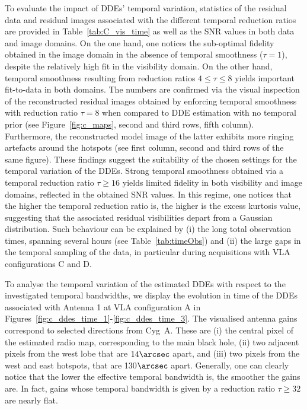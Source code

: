 \documentclass[fleqn,usenatbib]{mnras}
\begin{document}
To evaluate the impact of DDEs' temporal variation, statistics of the residual data and residual images associated with the different temporal reduction ratios are provided in Table~\ref{tab:C_vis_time} as well as the SNR values in both data and image domains. 
On the one hand, one notices the sub-optimal fidelity obtained in the image domain in the absence of temporal smoothness ($\tau=1$), despite the relatively high fit in the visibility domain. On the other hand, temporal smoothness resulting from reduction ratios $4\leq \tau \leq 8$ yields important fit-to-data in both domains. The numbers are confirmed via the visual inspection of the reconstructed residual images obtained by enforcing temporal smoothness with reduction ratio $\tau=8$ when compared to DDE estimation with no temporal prior (see Figure~\ref{fig:c_maps}, second and third rows, fifth column). Furthermore, the reconstructed model image of the latter exhibits more ringing artefacts around the hotspots (see first column, second and third rows of the same figure). These findings suggest the suitability of the chosen settings for the temporal variation of the DDEs. Strong temporal smoothness obtained via a temporal reduction ratio $\tau\geq 16$ yields limited fidelity in both visibility and image domains, reflected in the obtained SNR values. In this regime, one notices that the higher the temporal reduction ratio is, the higher is the excess kurtosis value, suggesting that the associated residual visibilities depart from a Gaussian distribution. Such behaviour can be explained by (i) the long total observation times, spanning several hours (see Table~\ref{tab:timeObs}) and (ii) the large gaps in the temporal sampling of the data, in particular during acquisitions with {{VLA}} configurations C and D.


To analyse the temporal variation of the estimated DDEs with respect to the investigated temporal bandwidths, we display the evolution in time of the DDEs associated with Antenna 1 at {{VLA}} configuration A in Figures~\ref{fig:c_ddes_time_1}-\ref{fig:c_ddes_time_3}. The visualised antenna gains correspond to selected directions from Cyg~A. These are (i) the central pixel of the estimated radio map, corresponding to the main black hole, (ii) two adjacent pixels from the west lobe that are $14\arcsec$ apart, and (iii) two pixels from the west and east hotspots, that are 130$\arcsec$ apart.
Generally, one can clearly notice that the lower the effective temporal bandwidth is, the smoother the gains are. In fact, gains whose temporal bandwidth is given by a reduction ratio $\tau \geq 32$ are nearly flat.
\end{document}
